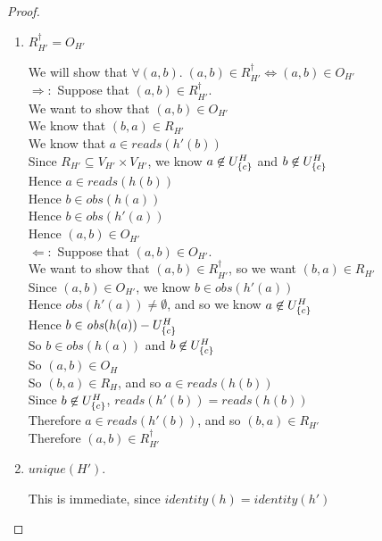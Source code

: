\begin{proof}
\begin{enumerate}
\item $R^\dagger_{H'} = O_{H'}$ 
  \begin{tabbedproof}
    \oo We will show that $\forall (a,b).\; (a,b) \in R^\dagger_{H'} \iff (a,b) \in O_{H'}$ \\ 
    \oo $\Rightarrow:$ Suppose that $(a, b) \in R^\dagger_{H'}$. \\
    \ooo We want to show that $(a, b) \in O_{H'}$ \\
    \ooo We know that $(b, a) \in R_{H'}$ \\
    \ooo We know that $a \in \mathit{reads}(h'(b))$ \\
    \ooo Since $R_{H'} \subseteq V_{H'} \times V_{H'}$, we know $a \not\in U^H_{\{{c}\}}$ and $b \not \in U^H_{\{{c}\}}$ \\
    \ooo Hence $a \in \mathit{reads}(h(b))$ \\ 
    \ooo Hence $b \in \mathit{obs}(h(a))$ \\
    \ooo Hence $b \in \mathit{obs}(h'(a))$ \\
    \ooo Hence $(a,b) \in O_{H'}$ \\
    \oo $\Leftarrow:$ Suppose that $(a, b) \in O_{H'}$. \\
    \ooo We want to show that $(a,b) \in R^\dagger_{H'}$, so we want $(b,a) \in R_{H'}$ \\
    \ooo Since $(a,b) \in O_{H'}$, we know $b \in \mathit{obs}(h'(a))$ \\
    \ooo Hence $\mathit{obs}(h'(a)) \not= \emptyset$, and so we know $a \not\in U^H_{\{{c}\}}$ \\
    \ooo Hence $b \in \mathit{obs}(h(a)) - U^H_{\{{c}\}}$ \\
    \ooo So $b \in \mathit{obs}(h(a))$ and $b \not \in U^H_{\{{c}\}}$ \\
    \ooo So $(a,b) \in O_H$ \\
    \ooo So $(b,a) \in R_H$, and so $a \in \mathit{reads}(h(b))$ \\
    \ooo Since $b \not\in U^H_{\{{c}\}}$, $\mathit{reads}(h'(b)) = \mathit{reads}(h(b))$ \\
    \ooo Therefore $a \in \mathit{reads}(h'(b))$, and so $(b,a) \in R_{H'}$ \\
    \ooo Therefore $(a,b) \in R^\dagger_{H'}$ 
  \end{tabbedproof}

\item $\mathit{unique}(H')$.

This is immediate, since $\mathit{identity}(h) = \mathit{identity}(h')$ 
\end{enumerate}
\end{proof}


